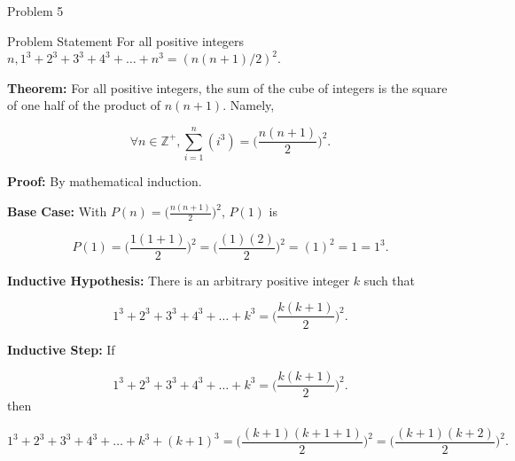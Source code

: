 \begin{problem}{Problem 5}
    \begin{statement}{Problem Statement}
        For all positive integers $n, 1^{3} + 2^{3} + 3^{3} + 4^{3} + \dots + n^{3} = (n(n + 1)/2)^{2}$.
    \end{statement}

    \begin{Highlight}[Solution]
        \noindent \textbf{Theorem:} For all positive integers, the sum of the cube of integers is the square of one half of the product of $n(n + 1)$. Namely,

        \begin{equation*}
            \forall n \in \mathbb{Z}^{+}, \sum_{i = 1}^{n} (i^{3}) = \Big(\frac{n(n + 1)}{2}\Big)^{2}.
        \end{equation*}

        \noindent \textbf{Proof:} By mathematical induction. \vspace*{1em}

        \noindent \textbf{Base Case:} With $P(n) = \Big(\frac{n(n + 1)}{2}\Big)^{2}$, $P(1)$ is 

        \begin{equation*}
            P(1) = \Big(\frac{1(1 + 1)}{2}\Big)^{2} = \Big(\frac{(1)(2)}{2}\Big)^{2} = (1)^{2} = 1 = 1^{3}.
        \end{equation*}

        \noindent \textbf{Inductive Hypothesis:} There is an arbitrary positive integer $k$ such that

        \begin{equation*}
            1^{3} + 2^{3} + 3^{3} + 4^{3} + \dots + k^{3} = \Big(\frac{k(k + 1)}{2}\Big)^{2}.
        \end{equation*}

        \noindent \textbf{Inductive Step:} If 

        \begin{equation*}
            1^{3} + 2^{3} + 3^{3} + 4^{3} + \dots + k^{3} = \Big(\frac{k(k + 1)}{2}\Big)^{2}.
        \end{equation*}
        then

        \begin{equation*}
            1^{3} + 2^{3} + 3^{3} + 4^{3} + \dots + k^{3} + (k + 1)^{3} = \Big(\frac{(k + 1)(k + 1 + 1)}{2}\Big)^{2} = \Big(\frac{(k + 1)(k + 2)}{2}\Big)^{2}.
        \end{equation*}


\end{Highlight}
\end{problem}

